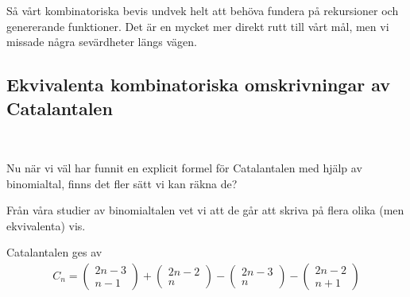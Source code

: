 \documentclass{tufte-handout}
\begin{document}
Så vårt kombinatoriska bevis undvek helt att behöva fundera på rekursioner och genererande funktioner. Det är en mycket mer direkt rutt till vårt mål, men vi missade några sevärdheter längs vägen.


\subsection{Ekvivalenta kombinatoriska omskrivningar av Catalantalen}\hfill\\\par
Nu när vi väl har funnit en explicit formel för Catalantalen med hjälp av binomialtal, finns det fler sätt vi kan räkna de?\par
\noindent Från våra studier av binomialtalen vet vi att de går att skriva på flera olika (men ekvivalenta) vis. \par
\begin{cor}
  Catalantalen ges av 
  \begin{equation*}
    \begin{gathered}
      C_n = \begin{pmatrix}2n-3\\n-1\end{pmatrix}+\begin{pmatrix}2n-2\\n\end{pmatrix}-\begin{pmatrix}2n-3\\n\end{pmatrix}-\begin{pmatrix}2n-2\\n+1\end{pmatrix}
    \end{gathered}
  \end{equation*}
\end{cor}\par
\end{document}
